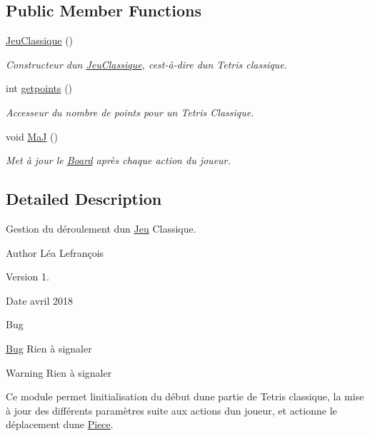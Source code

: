\subsection*{Public Member Functions}
\begin{DoxyCompactItemize}
\item 
\mbox{\label{classJeuClassique_a9b8c0cab457b50d054746d71318be396}} 
\hyperlink{classJeuClassique_a9b8c0cab457b50d054746d71318be396}{Jeu\+Classique} ()
\begin{DoxyCompactList}\small\item\em Constructeur d\textquotesingle{}un \hyperlink{classJeuClassique}{Jeu\+Classique}, c\textquotesingle{}est-\/à-\/dire d\textquotesingle{}un Tetris classique. \end{DoxyCompactList}\item 
int \hyperlink{classJeuClassique_ab6429ffc180431b667e891e329c91cb4}{getpoints} ()
\begin{DoxyCompactList}\small\item\em Accesseur du nombre de points pour un Tetris Classique. \end{DoxyCompactList}\item 
\mbox{\label{classJeuClassique_ad61cdc881a8f6532a9bc59e91e64affb}} 
void \hyperlink{classJeuClassique_ad61cdc881a8f6532a9bc59e91e64affb}{MaJ} ()
\begin{DoxyCompactList}\small\item\em Met à jour le \hyperlink{classBoard}{Board} après chaque action du joueur. \end{DoxyCompactList}\end{DoxyCompactItemize}


\subsection{Detailed Description}
Gestion du déroulement d\textquotesingle{}un \hyperlink{classJeu}{Jeu} Classique. 

\begin{DoxyAuthor}{Author}
Léa Lefrançois 
\end{DoxyAuthor}
\begin{DoxyVersion}{Version}
1. 
\end{DoxyVersion}
\begin{DoxyDate}{Date}
avril 2018 
\end{DoxyDate}
\begin{DoxyRefDesc}{Bug}
\item[\hyperlink{bug__bug000007}{Bug}]Rien à signaler \end{DoxyRefDesc}
\begin{DoxyWarning}{Warning}
Rien à signaler
\end{DoxyWarning}
Ce module permet l\textquotesingle{}initialisation du début d\textquotesingle{}une partie de Tetris classique, la mise à jour des différents paramètres suite aux actions d\textquotesingle{}un joueur, et actionne le déplacement d\textquotesingle{}une \hyperlink{classPiece}{Piece}. 

